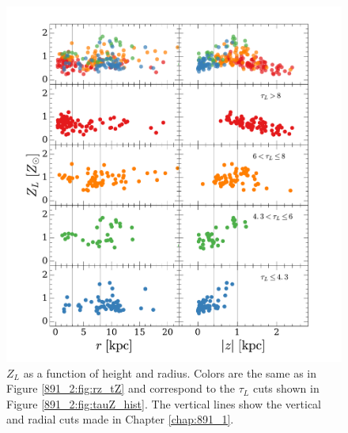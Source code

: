 \begin{figure}
  \centering
  \includegraphics[width=\textwidth]{891_2/figs/MLWZ_rz_cut.pdf}
  \caption[$Z_L$ as function of
    ($r,|z|$)]{\fixspacing\label{891_2:fig:MLWZ_rz_cut}$Z_L$ as a
    function of height and radius. Colors are the same as in Figure
    \ref{891_2:fig:rz_tZ} and correspond to the $\tau_L$ cuts shown in
    Figure \ref{891_2:fig:tauZ_hist}. The vertical lines show the
    vertical and radial cuts made in Chapter \ref{chap:891_1}.}
\end{figure}

